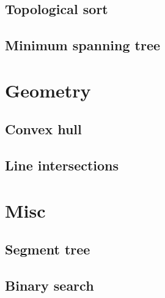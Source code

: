 \documentclass[a4paper,10pt]{article}
\begin{document}
\subsection{Topological sort}
\subsection{Minimum spanning tree}
\section{Geometry}
\subsection{Convex hull}
\subsection{Line intersections}
\section{Misc}
\subsection{Segment tree}
\subsection{Binary search}
\end{document}
